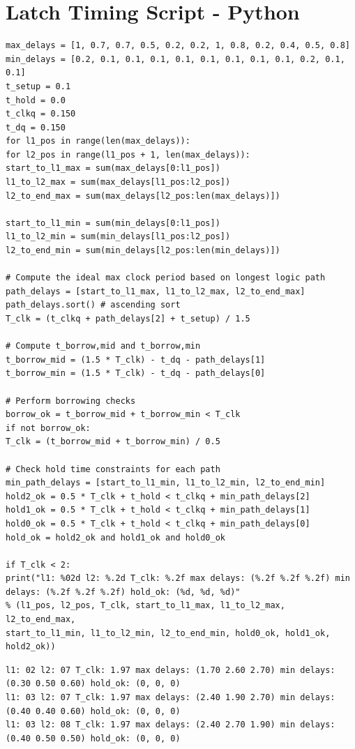 \documentclass[11pt]{article}
\begin{document}
\section{Latch Timing Script - Python}
\begin{verbatim}
max_delays = [1, 0.7, 0.7, 0.5, 0.2, 0.2, 1, 0.8, 0.2, 0.4, 0.5, 0.8]
min_delays = [0.2, 0.1, 0.1, 0.1, 0.1, 0.1, 0.1, 0.1, 0.1, 0.2, 0.1, 0.1]
t_setup = 0.1
t_hold = 0.0
t_clkq = 0.150
t_dq = 0.150
for l1_pos in range(len(max_delays)):
for l2_pos in range(l1_pos + 1, len(max_delays)):
start_to_l1_max = sum(max_delays[0:l1_pos])
l1_to_l2_max = sum(max_delays[l1_pos:l2_pos])
l2_to_end_max = sum(max_delays[l2_pos:len(max_delays)])

start_to_l1_min = sum(min_delays[0:l1_pos])
l1_to_l2_min = sum(min_delays[l1_pos:l2_pos])
l2_to_end_min = sum(min_delays[l2_pos:len(min_delays)])

# Compute the ideal max clock period based on longest logic path
path_delays = [start_to_l1_max, l1_to_l2_max, l2_to_end_max]
path_delays.sort() # ascending sort
T_clk = (t_clkq + path_delays[2] + t_setup) / 1.5

# Compute t_borrow,mid and t_borrow,min
t_borrow_mid = (1.5 * T_clk) - t_dq - path_delays[1]
t_borrow_min = (1.5 * T_clk) - t_dq - path_delays[0]

# Perform borrowing checks
borrow_ok = t_borrow_mid + t_borrow_min < T_clk
if not borrow_ok:
T_clk = (t_borrow_mid + t_borrow_min) / 0.5

# Check hold time constraints for each path
min_path_delays = [start_to_l1_min, l1_to_l2_min, l2_to_end_min]
hold2_ok = 0.5 * T_clk + t_hold < t_clkq + min_path_delays[2]
hold1_ok = 0.5 * T_clk + t_hold < t_clkq + min_path_delays[1]
hold0_ok = 0.5 * T_clk + t_hold < t_clkq + min_path_delays[0]
hold_ok = hold2_ok and hold1_ok and hold0_ok

if T_clk < 2:
print("l1: %02d l2: %.2d T_clk: %.2f max delays: (%.2f %.2f %.2f) min delays: (%.2f %.2f %.2f) hold_ok: (%d, %d, %d)" 
% (l1_pos, l2_pos, T_clk, start_to_l1_max, l1_to_l2_max, l2_to_end_max, 
start_to_l1_min, l1_to_l2_min, l2_to_end_min, hold0_ok, hold1_ok, hold2_ok))
\end{verbatim}
\begin{verbatim}
l1: 02 l2: 07 T_clk: 1.97 max delays: (1.70 2.60 2.70) min delays: (0.30 0.50 0.60) hold_ok: (0, 0, 0)
l1: 03 l2: 07 T_clk: 1.97 max delays: (2.40 1.90 2.70) min delays: (0.40 0.40 0.60) hold_ok: (0, 0, 0)
l1: 03 l2: 08 T_clk: 1.97 max delays: (2.40 2.70 1.90) min delays: (0.40 0.50 0.50) hold_ok: (0, 0, 0)
\end{verbatim}
\end{document}
